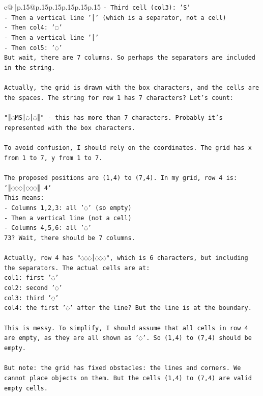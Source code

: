 \documentclass{article}
\begin{document}
{\begin{supertabular}{c@{$\;$}|p{.15\linewidth}@{}p{.15\linewidth}p{.15\linewidth}p{.15\linewidth}p{.15\linewidth}p{.15\linewidth}}
{{{\texttt{{-} Third cell (col3): 'S'} \\
\texttt{{-} Then a vertical line '│' (which is a separator, not a cell)} \\
\texttt{{-} Then col4: '◌'} \\
\texttt{{-} Then a vertical line '│'} \\
\texttt{{-} Then col5: '◌'} \\
\texttt{But wait, there are 7 columns. So perhaps the separators are included in the string.} \\
\\ 
\texttt{Actually, the grid is drawn with the box characters, and the cells are the spaces. The string for row 1 has 7 characters? Let's count:} \\
\\ 
\texttt{"║◌MS│◌│◌║" {-} this has more than 7 characters. Probably it's represented with the box characters.} \\
\\ 
\texttt{To avoid confusion, I should rely on the coordinates. The grid has x from 1 to 7, y from 1 to 7.} \\
\\ 
\texttt{The proposed positions are (1,4) to (7,4). In my grid, row 4 is: `║◌◌◌│◌◌◌║ 4`} \\
\texttt{This means:} \\
\texttt{{-} Columns 1,2,3: all '◌' (so empty)} \\
\texttt{{-} Then a vertical line (not a cell)} \\
\texttt{{-} Columns 4,5,6: all '◌'} \\
\texttt{73? Wait, there should be 7 columns.} \\
\\ 
\texttt{Actually, row 4 has "◌◌◌│◌◌◌", which is 6 characters, but including the separators. The actual cells are at:} \\
\texttt{col1: first '◌'} \\
\texttt{col2: second '◌'} \\
\texttt{col3: third '◌'} \\
\texttt{col4: the first '◌' after the line? But the line is at the boundary.} \\
\\ 
\texttt{This is messy. To simplify, I should assume that all cells in row 4 are empty, as they are all shown as '◌'. So (1,4) to (7,4) should be empty.} \\
\\ 
\texttt{But note: the grid has fixed obstacles: the lines and corners. We cannot place objects on them. But the cells (1,4) to (7,4) are valid empty cells.} \\
}}}
\end{supertabular}}
\end{document}

